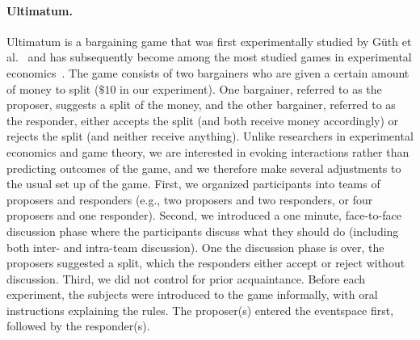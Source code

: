 \paragraph{Ultimatum.} Ultimatum is a bargaining game that was first experimentally studied by G\"uth et al.~\cite{Guth-82} and has subsequently become among the most studied games in experimental economics~\cite{Chaudhuri-09}. The game consists of two bargainers who are given a certain amount of money to split ($\$10$ in our experiment). One bargainer, referred to as the proposer, suggests a split of the money, and the other bargainer, referred to as the responder, either accepts the split (and both receive money accordingly) or rejects the split (and neither receive anything). Unlike researchers in experimental economics and game theory, we are interested in evoking interactions rather than predicting outcomes of the game, and we therefore make several adjustments to the usual set up of the game. First, we organized participants into teams of proposers and responders (e.g., two proposers and two responders, or four proposers and one responder). Second, we introduced a one minute, face-to-face discussion phase where the participants discuss what they should do (including both inter- and intra-team discussion). One the discussion phase is over, the proposers suggested a split, which the responders either accept or reject without discussion. Third, we did not control for prior acquaintance. Before each experiment, the subjects were introduced to the game informally, with oral instructions explaining the rules. The proposer(s) entered the eventspace first, followed by the responder(s). 

%

